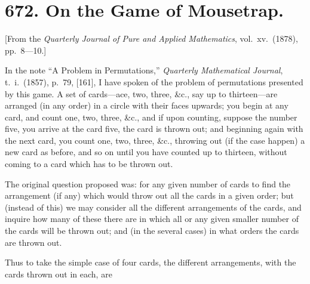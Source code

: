 \documentclass[11pt,a4paper]{book}
\begin{document}
\newpage

\section*{672. On the Game of Mousetrap.}

[From the \textit{Quarterly Journal of Pure and Applied Mathematics}, vol.\ xv.\ (1878), pp.\ 8---10.]

In the note ``A Problem in Permutations,'' \textit{Quarterly Mathematical Journal}, t.\ i.\ (1857), p.\ 79, [161], I have spoken of the problem of permutations presented by this game. A set of cards---ace, two, three, \&c., say up to thirteen---are arranged (in any order) in a circle with their faces upwards; you begin at any card, and count one, two, three, \&c., and if upon counting, suppose the number five, you arrive at the card five, the card is thrown out; and beginning again with the next card, you count one, two, three, \&c., throwing out (if the case happen) a new card as before, and so on until you have counted up to thirteen, without coming to a card which has to be thrown out.

The original question proposed was: for any given number of cards to find the arrangement (if any) which would throw out all the cards in a given order; but (instead of this) we may consider all the different arrangements of the cards, and inquire how many of these there are in which all or any given smaller number of the cards will be thrown out; and (in the several cases) in what orders the cards are thrown out.

Thus to take the simple case of four cards, the different arrangements, with the cards thrown out in each, are
\end{document}
